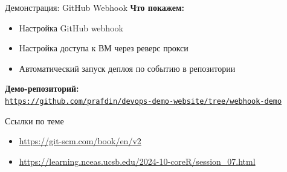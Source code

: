 \documentclass[aspectratio=169]{beamer}
\begin{document}
    \begin{frame}{Демонстрация: GitHub Webhook}
        \textbf{Что покажем:}
        \begin{itemize}
            \item Настройка GitHub webhook
            \item Настройка доступа к ВМ через реверс прокси
            \item Автоматический запуск деплоя по событию в репозитории
        \end{itemize}

        \vspace{0.2cm}
        \textbf{Демо-репозиторий:} \\
        \href{https://github.com/prafdin/devops-demo-website/tree/webhook-demo}{\texttt{https://github.com/prafdin/devops-demo-website/tree/webhook-demo}}
    \end{frame}

    \begin{frame}{Ссылки по теме}
        \begin{itemize}
            \item \url{https://git-scm.com/book/en/v2}
            \item \url{https://learning.nceas.ucsb.edu/2024-10-coreR/session_07.html}
        \end{itemize}
    \end{frame}
\end{document}

